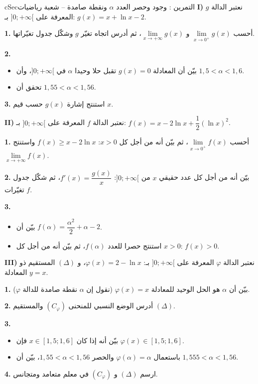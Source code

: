 \documentclass[12pt,a4paper]{article}
\newenvironment{BOX}[2]{\begin{otherlanguage}{english}\begin{arbox}{#1}{#2}}{\end{arbox}\end{otherlanguage}}
\newcounter{exo}
\newenvironment{tamrin}[1]{\stepcounter{exo}\begin{BOX}{cSec}{التمرين \theexo: #1}}{\end{BOX}}
\newenvironment{sq}{\begin{itemize}[leftmargin=2.4em,itemsep=3pt]}{\end{itemize}}
\newcommand{\qa}{\item[(أ)]}\newcommand{\qb}{\item[(ب)]}\newcommand{\qc}{\item[(جـ)]}\newcommand{\qd}{\item[(د)]}\newcommand{\qe}{\item[(هـ)]}
\newcommand{\QQ}[1]{\par\smallskip\textbf{#1.} }
\begin{document}
\begin{tamrin}{وجود وحصر العدد $\alpha$ ونقطة صامدة -- شعبة رياضيات}
\textbf{I)} نعتبر الدالة $g$ المعرفة على $]0;+\infty[$ بـ: $g(x)=x+\ln x-2$.
\QQ{1} أحسب $\lim\limits_{x\to 0^{+}}g(x)$ و $\lim\limits_{x\to +\infty}g(x)$، ثم أدرس اتجاه تغيّر $g$ وشكّل جدول تغيّراتها.
\QQ{2}
\begin{sq}
\qa بيّن أن المعادلة $g(x)=0$ تقبل حلا وحيدا $\alpha$ في $]0;+\infty[$، وأن $1{,}5<\alpha<1{,}6$.
\qb تحقق أن $1{,}55<\alpha<1{,}56$.
\end{sq}
\QQ{3} استنتج إشارة $g(x)$ حسب قيم $x$.

\textbf{II)} نعتبر الدالة $f$ المعرفة على $]0;+\infty[$ بـ: $f(x)=x-2\ln x+\dfrac{1}{2}(\ln x)^{2}$.
\QQ{1} أحسب $\lim\limits_{x\to 0^{+}}f(x)$، ثم بيّن أنه من أجل كل $x>0$: $f(x)\geqslant x-2\ln x$ واستنتج $\lim\limits_{x\to +\infty}f(x)$.
\QQ{2} بيّن أنه من أجل كل عدد حقيقي $x$ من $]0;+\infty[$: $f'(x)=\dfrac{g(x)}{x}$، ثم شكّل جدول تغيّرات $f$.
\QQ{3}
\begin{sq}
\qa بيّن أن $f(\alpha)=\dfrac{\alpha^{2}}{2}+\alpha-2$.
\qb استنتج حصرا للعدد $f(\alpha)$، ثم بيّن أنه من أجل كل $x>0$: $f(x)>0$.
\end{sq}

\textbf{III)} نعتبر الدالة $\varphi$ المعرفة على $]0;+\infty[$ بـ: $\varphi(x)=2-\ln x$، و $(\Delta)$ المستقيم ذو المعادلة $y=x$.
\QQ{1} بيّن أن $\alpha$ هو الحل الوحيد للمعادلة $\varphi(x)=x$ (نقول إن $\alpha$ نقطة صامدة للدالة $\varphi$).
\QQ{2} أدرس الوضع النسبي للمنحنى $(C_\varphi)$ والمستقيم $(\Delta)$.
\QQ{3}
\begin{sq}
\qa بيّن أنه إذا كان $x\in[1{,}5;1{,}6]$ فإن $\varphi(x)\in[1{,}5;1{,}6]$.
\qb باستعمال $\varphi(\alpha)=\alpha$ والحصر $1{,}55<\alpha<1{,}56$، بيّن أن $1{,}555<\alpha<1{,}56$.
\end{sq}
\QQ{4} ارسم $(\Delta)$ و $(C_\varphi)$ في معلم متعامد ومتجانس.
\end{tamrin}
\end{document}
